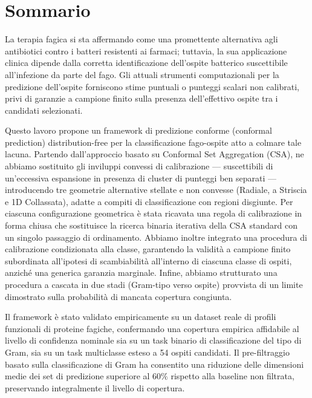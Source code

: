 

\chapter*{Sommario}
\noindent
La terapia fagica si sta affermando come una promettente alternativa agli antibiotici contro i batteri resistenti ai 
farmaci; tuttavia, la sua applicazione clinica dipende dalla corretta identificazione dell'ospite batterico suscettibile 
all'infezione da parte del fago. Gli attuali strumenti computazionali per la predizione dell'ospite forniscono stime 
puntuali o punteggi scalari non calibrati, privi di garanzie a campione finito sulla presenza dell'effettivo ospite tra 
i candidati selezionati.

Questo lavoro propone un framework di predizione conforme (conformal prediction) distribution-free per la classificazione 
fago-ospite atto a colmare tale lacuna. Partendo dall'approccio basato su Conformal Set Aggregation (CSA), ne abbiamo 
sostituito gli inviluppi convessi di calibrazione — suscettibili di un'eccessiva espansione in presenza di cluster di 
punteggi ben separati — introducendo tre geometrie alternative stellate e non convesse (Radiale, a Striscia e 1D 
Collassata), adatte a compiti di classificazione con regioni disgiunte. Per ciascuna configurazione geometrica è 
stata ricavata una regola di calibrazione in forma chiusa che sostituisce la ricerca binaria iterativa della CSA 
standard con un singolo passaggio di ordinamento. Abbiamo inoltre integrato una procedura di calibrazione condizionata 
alla classe, garantendo la validità a campione finito subordinata all'ipotesi di scambiabilità all'interno di ciascuna 
classe di ospiti, anziché una generica garanzia marginale. Infine, abbiamo strutturato una procedura a cascata in due 
stadi (Gram-tipo verso ospite) provvista di un limite dimostrato sulla probabilità di mancata copertura congiunta.

Il framework è stato validato empiricamente su un dataset reale di profili funzionali di proteine fagiche, confermando 
una copertura empirica affidabile al livello di confidenza nominale sia su un task binario di classificazione del tipo 
di Gram, sia su un task multiclasse esteso a 54 ospiti candidati. Il pre-filtraggio basato sulla classificazione di 
Gram ha consentito una riduzione delle dimensioni medie dei set di predizione superiore al $60\%$ rispetto alla baseline 
non filtrata, preservando integralmente il livello di copertura.



